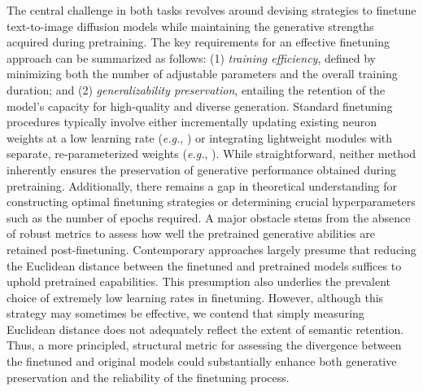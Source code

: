 The central challenge in both tasks revolves around devising strategies to finetune text-to-image diffusion models while maintaining the generative strengths acquired during pretraining. The key requirements for an effective finetuning approach can be summarized as follows: (1) \emph{training efficiency}, defined by minimizing both the number of adjustable parameters and the overall training duration; and (2) \emph{generalizability preservation}, entailing the retention of the model’s capacity for high-quality and diverse generation. Standard finetuning procedures typically involve either incrementally updating existing neuron weights at a low learning rate (\emph{e.g.}, \cite{ruiz2023dreambooth}) or integrating lightweight modules with separate, re-parameterized weights (\emph{e.g.}, \cite{hulora2022,zhang2023adding}). While straightforward, neither method inherently ensures the preservation of generative performance obtained during pretraining. Additionally, there remains a gap in theoretical understanding for constructing optimal finetuning strategies or determining crucial hyperparameters such as the number of epochs required. A major obstacle stems from the absence of robust metrics to assess how well the pretrained generative abilities are retained post-finetuning. Contemporary approaches largely presume that reducing the Euclidean distance between the finetuned and pretrained models suffices to uphold pretrained capabilities. This presumption also underlies the prevalent choice of extremely low learning rates in finetuning. However, although this strategy may sometimes be effective, we contend that simply measuring Euclidean distance does not adequately reflect the extent of semantic retention. Thus, a more principled, structural metric for assessing the divergence between the finetuned and original models could substantially enhance both generative preservation and the reliability of the finetuning process.

